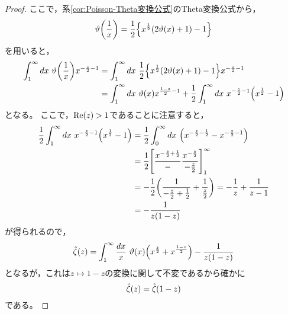 \documentclass[a4paper,draft]{ltjsarticle}
\begin{document}
\begin{thm}
\begin{proof}
        ここで，系\ref{cor:Poisson-Theta変換公式}のTheta変換公式から，
        \begin{equation}
            \fun{\vartheta}{\frac{1}{x}}=\frac{1}{2}\bra{x^{\frac{1}{2}}\pare{2\fun{\vartheta}{x}+1}-1}
        \end{equation}
        を用いると，
        \begin{align}
            \int_1^\infty dx\ \fun{\vartheta}{\frac{1}{x}}x^{-\frac{z}{2}-1}
            &=\int_1^\infty dx\ \frac{1}{2}\bra{x^{\frac{1}{2}}\pare{2\fun{\vartheta}{x}+1}-1} x^{-\frac{z}{2}-1}
            \\
            &=\int_1^\infty dx\ \fun{\vartheta}{x}x^{\frac{1-z}{2}-1}+\frac{1}{2}\int_1^\infty dx\ x^{-\frac{z}{2}-1}\pare{x^{\frac{1}{2}}-1}
        \end{align}
        となる。
        ここで，$\re{z}>1$であることに注意すると，
        \begin{align}
            \frac{1}{2}\int_1^\infty dx\ x^{-\frac{z}{2}-1}\pare{x^{\frac{1}{2}}-1}&=\frac{1}{2}\int_0^\infty dx\ \pare{x^{-\frac{z}{2}-\frac{1}{2}}-x^{-\frac{z}{2}-1}}
            \\
            &=\frac{1}{2}\squ{\frac{x^{-\frac{z}{2}+\frac{1}{2}}}-\frac{x^{-\frac{z}{2}}}{-\frac{z}{2}}}_1^\infty
            \\
            &=-\frac{1}{2}\pare{\frac{1}{-\frac{z}{2}+\frac{1}{2}}+\frac{1}{\frac{z}{2}}}=-\frac{1}{z}+\frac{1}{z-1}
            \\
            &=-\frac{1}{z\pare{1-z}}
        \end{align}
        が得られるので，
        \begin{equation}
            \fun{\hat{\zeta}}{z}=\int_1^\infty \frac{dx}{x}\ \fun{\vartheta}{x}\pare{x^{\frac{z}{2}}+x^{\frac{1-z}{2}}}-\frac{1}{z\pare{1-z}}
        \end{equation}
        となるが，これは$z\mapsto 1-z$の変換に関して不変であるから確かに
        \begin{equation}
            \fun{\hat{\zeta}}{z}=\fun{\hat{\zeta}}{1-z}
        \end{equation}
        である。
    \end{proof}
\end{thm}
\end{document}
